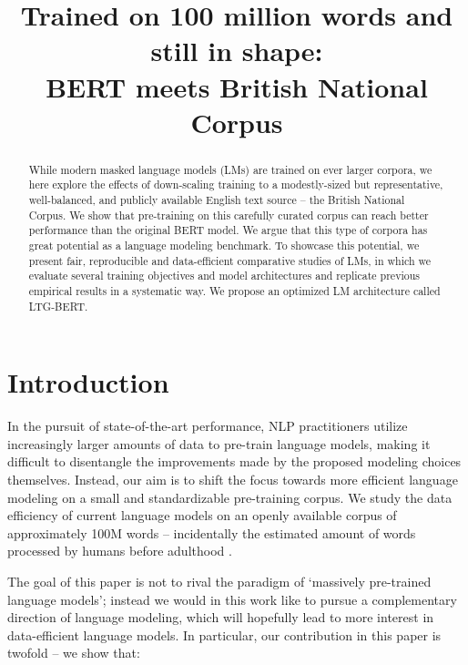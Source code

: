 \title{Trained on 100 million words and still in shape: \\BERT meets British National Corpus}



\maketitle
    
    \begin{abstract}
    
While modern masked language models (LMs) are trained on ever larger corpora, we here explore the effects of down-scaling training to a modestly-sized but representative, well-balanced, and publicly available English text source -- the British National Corpus. We show that pre-training on this carefully curated corpus can reach better performance than the original BERT model. We argue that this type of corpora has great potential as a language modeling benchmark. To showcase this potential, we present fair, reproducible and data-efficient comparative studies of LMs, in which we evaluate several training objectives and model architectures and replicate previous empirical results in a systematic way. We propose an optimized LM architecture called LTG-BERT.
    
    \end{abstract}
    
    \section{Introduction}
    In the pursuit of state-of-the-art performance, NLP practitioners utilize increasingly larger amounts of data to pre-train language models, %
    making it difficult to disentangle the improvements made by the proposed modeling choices themselves. 
    Instead, our aim is to shift the focus towards more efficient language modeling on a small and standardizable pre-training corpus.
    We study the data efficiency of current language models on an openly available corpus of approximately 100M words -- incidentally the estimated amount of words processed by humans before adulthood \citep{linzen-2020-accelerate}.
    
     
The goal of this paper is not to rival the paradigm of `massively pre-trained language models'; instead we would in this work like to pursue a complementary direction of language modeling, which will hopefully lead to more interest in data-efficient language models. In particular, our contribution in this paper is twofold -- we show that:
    
